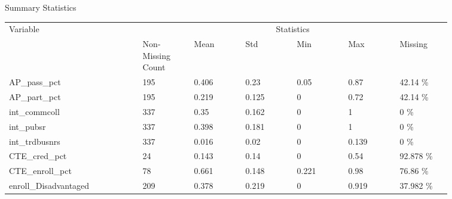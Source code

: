 \begin{threeparttable}
    \renewcommand\thetable{2}
    \caption{Summary Statistics} %
\label{tab:summarystats1} %
    \begin{tabular}{ p{0.26\linewidth} p{0.1\linewidth} p{0.1\linewidth} p{0.1\linewidth} p{0.1\linewidth} p{0.1\linewidth} p{0.1\linewidth}}     %
    \toprule %
    Variable                        & \multicolumn{6}{c}{Statistics} \\ %

                       \cmidrule(r){2-7} %
                                    &   Non-Missing Count   &   Mean & Std & Min & Max & Missing  \\ 
\midrule 

 AP\_pass\_pct  &  195  &  0.406  & 0.23    & 0.05 & 0.87  & 42.14 \%  \\ 
 AP\_part\_pct  &  195  &  0.219  & 0.125   & 0    & 0.72  & 42.14 \%  \\ 
 int\_commcoll  &  337  &  0.35   & 0.162   & 0    & 1     & 0 \%  \\ 
 int\_pubsr     &  337  &  0.398  & 0.181   & 0    & 1     & 0 \%  \\ 
 int\_trdbusnrs &  337  &  0.016  & 0.02    & 0    & 0.139 & 0 \%  \\
 CTE\_cred\_pct &  24   &  0.143  & 0.14    & 0    & 0.54  & 92.878 \%\\
 CTE\_enroll\_pct& 78 & 0.661 & 0.148 & 0.221 & 0.98 & 76.86 \% \\
 enroll\_Disadvantaged & 209 & 0.378 & 0.219 & 0 & 0.919 & 37.982 \% \\
\midrule
\end{tabular}

\end{threeparttable}